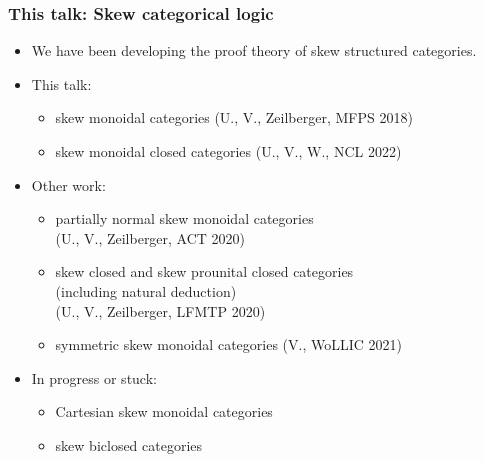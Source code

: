 \documentclass[10pt,t]{beamer}
\begin{document}
\begin{frame}

\frametitle{This talk: Skew categorical logic}

\begin{itemize}

\item We have been developing the proof theory of skew structured
  categories.

\bigskip

\item This talk: 

\begin{itemize} 
\item skew monoidal categories (U., V., Zeilberger, MFPS 2018) 
\item skew monoidal closed categories (U., V., W., NCL 2022)
\end{itemize}

\bigskip

\item Other work:

\begin{itemize}
\item partially normal skew monoidal categories \\ (U., V., Zeilberger, ACT 2020)
\item skew closed and skew prounital closed categories \\
  (including natural deduction) \\ (U., V., Zeilberger,
  LFMTP 2020)
\item symmetric skew monoidal categories (V., WoLLIC 2021)
\end{itemize}

\item In progress or stuck:

\begin{itemize}
\item Cartesian skew monoidal categories
\item skew biclosed categories
\end{itemize}

\end{itemize}

\end{frame}
\end{document}
